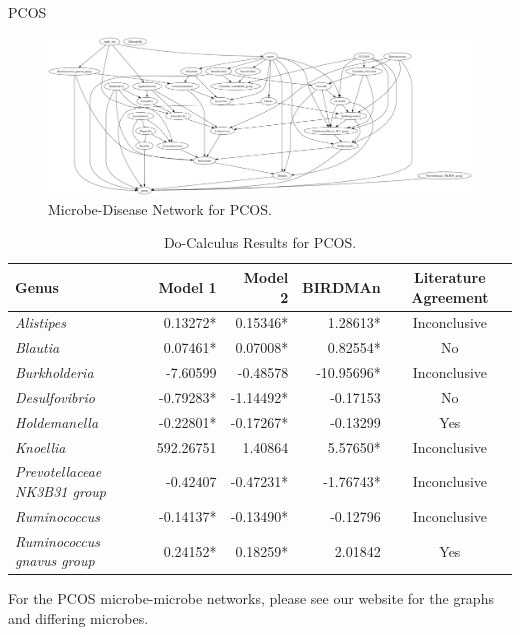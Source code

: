 \documentclass[final]{beamer}
\newlength{\colwidth}
\begin{document}
\begin{frame}[t]
\begin{columns}[t]
\begin{column}{\colwidth}
\begin{block}{PCOS}
    \begin{figure}
      \centering
      \includegraphics[width=\linewidth]{../graphs/pcos/cdnod_norm.png}
      \caption{Microbe-Disease Network for PCOS.}
    \end{figure}
    
    \begin{table}
      \centering
      \begin{tabular}{l r r r c}
        \toprule
        \textbf{Genus} & \textbf{Model 1} & \textbf{Model 2} & \textbf{BIRDMAn} & \textbf{Literature Agreement} \\
        \midrule
        \textit{Alistipes} & 0.13272* & 0.15346* & 1.28613* & Inconclusive \\
        \textit{Blautia} & 0.07461* & 0.07008* & 0.82554* & No \\
        \textit{Burkholderia} & -7.60599 & -0.48578 & -10.95696* & Inconclusive \\
        \textit{Desulfovibrio} & -0.79283* & -1.14492* & -0.17153 & No \\
        \textit{Holdemanella} & -0.22801* & -0.17267* & -0.13299 & Yes \\
        \textit{Knoellia} & 592.26751 & 1.40864 & 5.57650* & Inconclusive \\
        \textit{Prevotellaceae NK3B31 group} & -0.42407 & -0.47231* & -1.76743* & Inconclusive \\
        \textit{Ruminococcus} & -0.14137* & -0.13490* & -0.12796 & Inconclusive \\
        \textit{Ruminococcus gnavus group} & 0.24152* & 0.18259* & 2.01842 & Yes \\
        \bottomrule
      \end{tabular}
      \caption{Do-Calculus Results for PCOS.}
    \end{table}
    
    For the PCOS microbe-microbe networks, please see our website for the graphs and differing microbes. \\


\end{block}
\end{column}
\end{columns}
\end{frame}
\end{document}
